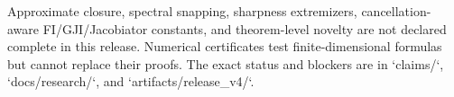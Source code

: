 \documentclass[11pt]{amsart}
\theoremstyle{definition}
\theoremstyle{remark}
\begin{document}
Approximate closure, spectral snapping, sharpness extremizers, cancellation-aware FI/GJI/Jacobiator constants, and theorem-level novelty are not declared complete in this release. Numerical certificates test finite-dimensional formulas but cannot replace their proofs. The exact status and blockers are in `claims/`, `docs/research/`, and `artifacts/release\_v4/`.
\end{document}
